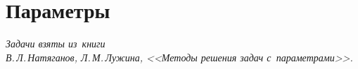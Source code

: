 
\section*{Параметры}

\emph{Задачи взяты из~книги\\
В.\,Л.\,Натяганов, Л.\,М.\,Лужина, <<Методы решения задач с~параметрами>>.}


\begingroup
    \def\abs#1{\lvert #1 \rvert}
    \def\bigabs#1{\bigl \lvert #1 \bigr \rvert}
    \ifx\mathup\undefined
        \def\piconst{\uppi}
    \else
        \def\piconst{\mathup{\pi}}
    \fi

